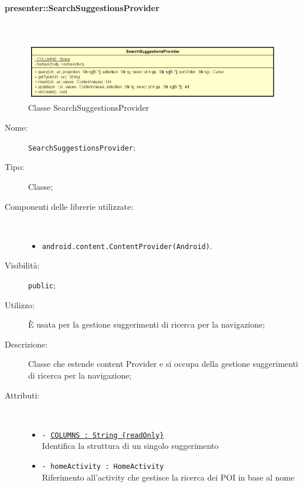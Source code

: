 \documentclass[../DefinizioneDiProdotto.tex]{subfiles}
\begin{document}
\paragraph{presenter::SearchSuggestionsProvider}
\
\begin{figure}[H]
	\centering
	\includegraphics[width=\maxwidth]{img/SearchSuggestionsProvider.png}
	\caption{Classe SearchSuggestionsProvider}\label{fig:presenter::SearchSuggestionsProvider} 
\end{figure}
\begin{description}
	\item[Nome:] \texttt{SearchSuggestionsProvider};
	\item[Tipo:] Classe;
	\item[Componenti delle librerie utilizzate:] \
	\begin{itemize}
		\item \texttt{android.content.ContentProvider(Android)}.
		
	\end{itemize}
	\item[Visibilità:] \texttt{public};
	\item[Utilizzo:] È usata per la gestione suggerimenti di ricerca per la navigazione;
	\item[Descrizione:] Classe che estende content Provider e si occupa della gestione suggerimenti di ricerca per la navigazione;
	\item[Attributi:] \
	\begin{itemize}
		\item \texttt{- \underline{COLUMNS : String \{readOnly\}}}\\
		Identifica la struttura di un singolo suggerimento
		
		\item \texttt{- homeActivity : HomeActivity}\\
		Riferimento all'activity che gestisce la ricerca dei POI in base al nome
		

\end{itemize}
\end{description}
\end{document}
